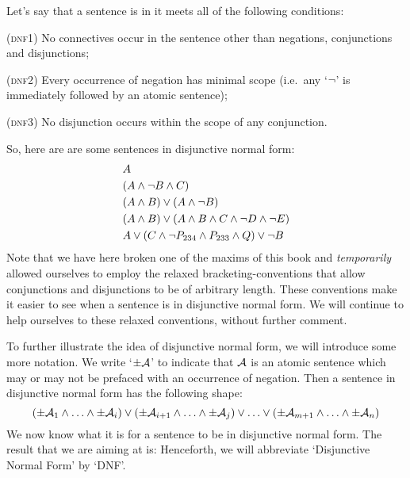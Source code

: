 Let's say that a sentence is in  \emph{\ifeff} it meets all of the following conditions:
	\begin{compactlist}
		\item[(\textsc{dnf1})] No connectives occur in the sentence other than negations, conjunctions and disjunctions;
		\item[(\textsc{dnf2})] Every occurrence of negation has minimal scope (i.e.\ any `$\neg$' is immediately followed by an atomic sentence);
		\item[(\textsc{dnf3})] No disjunction occurs within the scope of any conjunction.
	\end{compactlist}
So, here are are some sentences in disjunctive normal form:
\begin{align*}
  & A \\
  & (A \wedge \lnot B \wedge C)\\
  & (A \wedge B) \vee (A \wedge \neg B)\\
  & (A \wedge B) \vee (A \wedge  B \wedge C \wedge \neg D \wedge \neg E)\\
  & A \vee (C \wedge \neg P_{234} \wedge P_{233} \wedge Q) \vee \neg B
\end{align*}
Note that we have here broken one of the maxims of this book and \emph{temporarily} allowed ourselves to employ the relaxed bracketing-conventions that allow conjunctions and disjunctions to be of arbitrary length. These conventions make it easier to see when a sentence is in disjunctive normal form. We will continue to help ourselves to these relaxed conventions, without further comment.

To further illustrate the idea of disjunctive normal form, we will introduce some more notation. We write `$\pm\mathcal{A}$' to indicate that $\mathcal{A}$ is an atomic sentence which may or may not be prefaced with an occurrence of negation. Then a sentence in disjunctive normal form has the following shape:
	$$(\pm \mathcal{A}_1 \land \ldots \land \pm \mathcal{A}_i) \lor (\pm \mathcal{A}_{i+1} \land \ldots \land \pm\mathcal{A}_j) \lor \ldots \lor (\pm\mathcal{A}_{m+1} \land \ldots \land \pm \mathcal{A}_n)$$
We now know what it is for a sentence to be in disjunctive normal form. The result that we are aiming at is:
Henceforth, we will abbreviate `Disjunctive Normal Form' by `DNF'.


